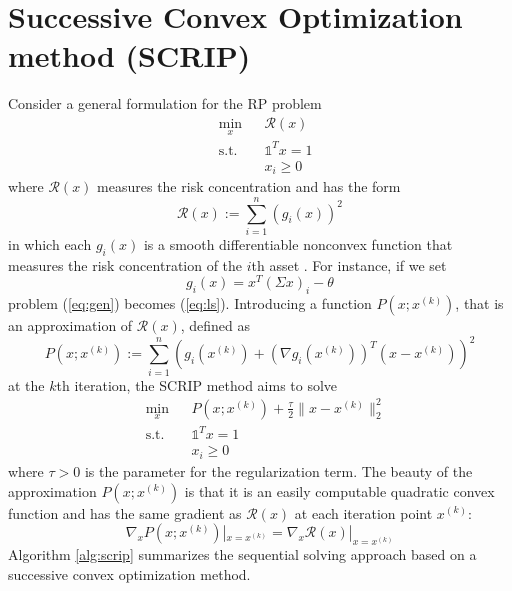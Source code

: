 \section{Successive Convex Optimization method (SCRIP)}
Consider a general formulation for the RP problem
\begin{equation}\label{eq:gen}
\begin{aligned}
& \underset{x}{\text{min}}
&& \mathcal{R}(x)\\
& \text{s.t.}
&&\mathds{1}^T x = 1\\
&&&x_i \geq 0
\end{aligned}
\end{equation}
where $\mathcal{R}(x)$ measures the risk concentration and has the form
\begin{equation}
\mathcal{R}(x) := \sum_{i=1}^n (g_i(x))^2
\end{equation}
in which each $g_i(x)$ is a smooth differentiable nonconvex
function that measures the risk concentration of the $i$th asset \cite{scrip}. For instance, if we set
\begin{equation}
g_i(x) = x^T (\Sigma x)_i - \theta
\end{equation}
problem (\ref{eq:gen}) becomes (\ref{eq:ls}). Introducing a function $P(x;x^{(k)})$, that is an approximation of $\mathcal{R}(x)$, defined as
\begin{equation}
P(x;x^{(k)}) := \sum_{i=1}^n (g_i(x^{(k)}) + (\nabla g_i(x^{(k)}))^T (x-x^{(k)}))^2
\end{equation}
at the $k$th iteration, the SCRIP method aims to solve 
\begin{equation}\label{eq:scrip1}
\begin{aligned}
& \underset{x}{\text{min}}
&&P(x;x^{(k)}) + \frac{\tau}{2}\parallel x - x^{(k)} \parallel^2_2\\
& \text{s.t.}
&&\mathds{1}^T x = 1\\
&&&x_i \geq 0
\end{aligned}
\end{equation}
where $\tau > 0$ is the parameter for the regularization term. The beauty of the approximation $P(x;x^{(k)})$ is that it is an
easily computable quadratic convex function and has the same
gradient as $\mathcal{R}(x)$ at each iteration point $x^{(k)}$:
\begin{equation}
\nabla_x P(x;x^{(k)})|_{x=x^{(k)}} = \nabla_x \mathcal{R}(x)|_{x=x^{(k)}}
\end{equation}
Algorithm \ref{alg:scrip} summarizes the sequential solving approach based on a successive convex optimization method.

